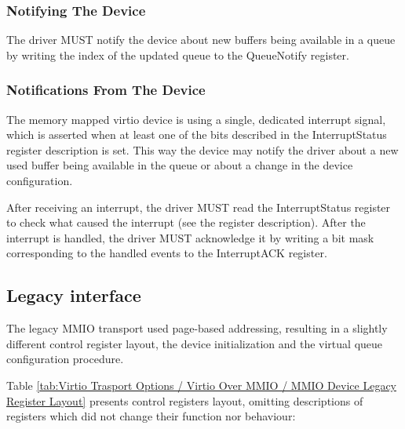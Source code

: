 \subsubsection{Notifying The Device}\label{sec:Virtio Transport Options / Virtio Over MMIO / MMIO-specific Initialization And Device Operation / Notifying The Device}

The driver MUST notify the device about new buffers being available in
a queue by writing the index of the updated queue to the QueueNotify register.

\subsubsection{Notifications From The Device}\label{sec:Virtio Transport Options / Virtio Over MMIO / MMIO-specific Initialization And Device Operation / Notifications From The Device}

The memory mapped virtio device is using a single, dedicated
interrupt signal, which is asserted when at least one of the
bits described in the InterruptStatus register
description is set. This way the device may notify the
driver about a new used buffer being available in the queue
or about a change in the device configuration.

After receiving an interrupt, the driver MUST read the
InterruptStatus register to check what caused the interrupt
(see the register description). After the interrupt is handled,
the driver MUST acknowledge it by writing a bit mask
corresponding to the handled events to the InterruptACK register.

\subsection{Legacy interface}\label{sec:Virtio Transport Options / Virtio Over MMIO / Legacy interface}

The legacy MMIO transport used page-based addressing, resulting
in a slightly different control register layout, the device
initialization and the virtual queue configuration procedure.

Table \ref{tab:Virtio Trasport Options / Virtio Over MMIO / MMIO Device Legacy Register Layout} 
presents control registers layout, omitting
descriptions of registers which did not change their function
nor behaviour:

